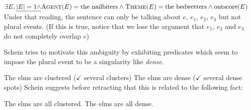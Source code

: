 \ex
$\exists E, \underline{|E| = 1\wedge} \textsc{Agent}(E)=\text{the nailbiters} \wedge \textsc{Theme}(E)=\text{the bedwetters} \wedge \text{outscore}(E)$ \label{lf2}
\xe
%
Under that reading, the sentence can only be talking about ${e}$, ${e_1}$, ${e_2}$, ${e_3}$ but not plural events. (If this is true, notice that we lose the argument that $e_1$, $e_2$ and $e_3$ do not completely overlap $e$) 

Schein tries to motivate this ambiguity by exhibiting predicates which seem to impose the plural event to be a singularity like \emph{dense}.

\pex
\a The elms are clustered ($\checkmark$ several clusters)
\a The elms are dense ($\checkmark$ several dense spots)
\xe
%
Schein suggests before retracting that this is related to the following fact:

\pex
\a The elms are all clustered.
\a *The elms are all dense.
\xe
%







